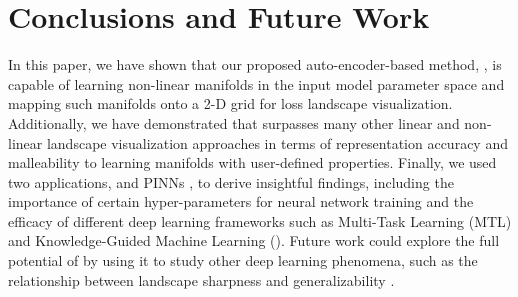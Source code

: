 \documentclass[letterpaper]{article} %
\begin{document}
      


            




         
            \section{Conclusions and Future Work} \label{se:conclusion}
                In this paper, we have shown that our proposed auto-encoder-based method, \proposedautencoder{}, is capable of learning non-linear manifolds in the input model parameter space and mapping such manifolds onto a 2-D grid for loss landscape visualization. Additionally, we have demonstrated that \proposedautencoder{} surpasses many other linear and non-linear landscape visualization approaches in terms of representation accuracy and malleability to learning manifolds with user-defined properties. Finally, we used two applications, \cophy{} \cite{elhamod2022cophy} and PINNs \cite{raissi2017physics1}, to derive insightful findings, including the importance of certain hyper-parameters for neural network training and the efficacy of different deep learning frameworks such as Multi-Task Learning (MTL) and Knowledge-Guided Machine Learning (\SGML). 
                Future work could explore the full potential of \proposedautencoder{} by using it to study other deep learning phenomena, such as the relationship between landscape sharpness and generalizability \cite{pmlr-v137-huang20a}.
                
\end{document}
